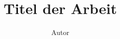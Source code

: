 \documentclass[11pt, twoside, openright, a4paper]{studdipl}
\title{Titel der Arbeit}
\author{Autor}
\begin{document}

\prepages

\maketitle

\cleardoublepage

\tableofcontents



\cleardoublepage

\mainbody


 

 


\begin{appendix}
	
\end{appendix}


\listoffigures


\printbibliography

\end{document}
